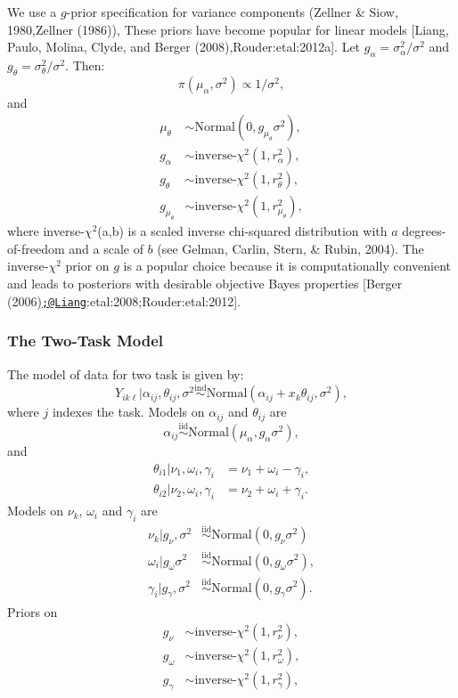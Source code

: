 \documentclass[english,man]{apa6}
\theoremstyle{definition}
\theoremstyle{definition}
\theoremstyle{definition}
\theoremstyle{remark}
\begin{document}
We use a \(g\)-prior specification for variance components (Zellner \&
Siow, 1980,Zellner (1986)), These priors have become popular for linear
models {[}Liang, Paulo, Molina, Clyde, and Berger
(2008),Rouder:etal:2012a{]}. Let \(g_\alpha=\sigma^2_\alpha/\sigma^2\)
and \(g_\theta=\sigma^2_\theta/\sigma^2\). Then: \[
\pi(\mu_\alpha,\sigma^2) \propto 1/\sigma^2,
\] and \[
\begin{aligned}
\mu_\theta & \sim \mbox{Normal}(0,g_{\mu_\theta}\sigma^2),\\
g_\alpha & \sim \mbox{inverse-$\chi^2$}(1,r^2_\alpha),\\
g_\theta & \sim \mbox{inverse-$\chi^2$}(1,r^2_\theta),\\
g_{\mu_\theta} & \sim \mbox{inverse-$\chi^2$}(1,r^2_{\mu_\theta}),
\end{aligned}
\] where inverse-\(\chi^2\)(a,b) is a scaled inverse chi-squared
distribution with \(a\) degrees-of-freedom and a scale of \(b\) (see
Gelman, Carlin, Stern, \& Rubin, 2004). The inverse-\(\chi^2\) prior on
\(g\) is a popular choice because it is computationally convenient and
leads to posteriors with desirable objective Bayes properties {[}Berger
(2006)\href{mailto:;@Liang}{\nolinkurl{;@Liang}}:etal:2008;Rouder:etal:2012{]}.

\subsubsection{The Two-Task Model}\label{the-two-task-model}

The model of data for two task is given by: \[
Y_{ik\ell}|\alpha_{ij},\theta_{ij},\sigma^2 \stackrel{\mbox{ind}}{\sim }\mbox{Normal}(\alpha_{ij}+x_k\theta_{ij},\sigma^2),
\] where \(j\) indexes the task. Models on \(\alpha_{ij}\) and
\(\theta_{ij}\) are \[
\alpha_{ij} \stackrel{\mbox{iid}}{\sim} \mbox{Normal}(\mu_\alpha,g_\alpha\sigma^2),\]
and \[
\begin{aligned}
\theta_{i1}|\nu_1,\omega_i,\gamma_i &= \nu_1 + \omega_i - \gamma_i,\\
\theta_{i2}|\nu_2,\omega_i,\gamma_i &= \nu_2 + \omega_i + \gamma_i.
\end{aligned}
\] Models on \(\nu_k\), \(\omega_i\) and \(\gamma_i\) are \[
\begin{aligned}
\nu_k|g_\nu,\sigma^2 & \stackrel{\mbox{iid}}{\sim}\mbox{Normal}(0,g_\nu\sigma^2)\\
\omega_i|g_\omega\sigma^2 &\stackrel{\mbox{iid}}{\sim} \mbox{Normal}(0,g_\omega\sigma^2),\\
\gamma_i|g_\gamma,\sigma^2 &\stackrel{\mbox{iid}}{\sim} \mbox{Normal}(0,g_\gamma\sigma^2).
\end{aligned}
\] Priors on \[
\begin{aligned}
g_\nu &\sim \mbox{inverse-$\chi^2$}(1,r^2_\nu),\\
g_\omega &\sim \mbox{inverse-$\chi^2$}(1,r^2_\omega),\\
g_\gamma &\sim \mbox{inverse-$\chi^2$}(1,r^2_\gamma),
\end{aligned}
\]
\end{document}
